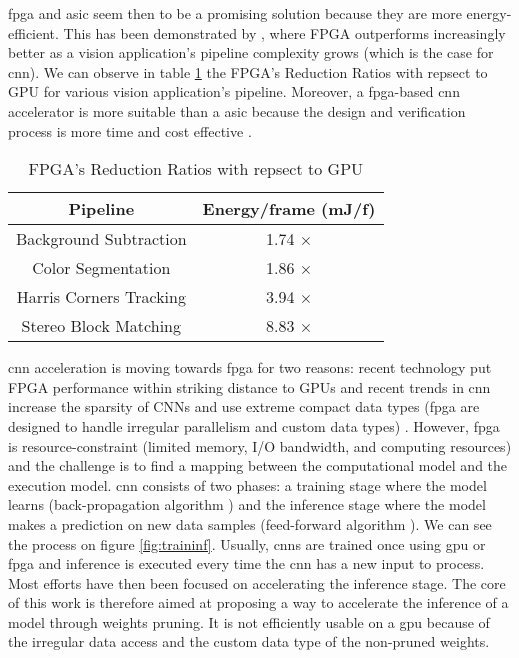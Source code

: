 \acrshort{fpga} and \acrshort{asic} seem then to be a promising solution because they are more energy-efficient. This has been demonstrated by \cite{qasaimeh_comparing_2019}, where FPGA outperforms increasingly better as a vision application’s pipeline complexity grows (which is the case for \acrshort{cnn}). We can observe in table \ref{tab:benchener} the FPGA’s Reduction Ratios with repsect to GPU for various vision application’s pipeline. Moreover, a \acrshort{fpga}-based \acrshort{cnn} accelerator is more suitable than a \acrshort{asic} because the design and verification process is more time and cost effective \cite{motamedi_placid_2017}.
\begin{table}
    \center
    \begin{tabular}{|c|c|}
        \hline
        Pipeline & Energy/frame (mJ/f) \\
        \hline
        Background Subtraction & 1.74 $\times$\\
        \hline
        Color Segmentation & 1.86 $\times$ \\
        \hline
        Harris Corners Tracking & 3.94 $\times$ \\
        \hline
        Stereo Block Matching & 8.83 $\times$ \\
        \hline
    \end{tabular}
    \caption{FPGA’s Reduction Ratios with repsect to GPU \cite{qasaimeh_comparing_2019}}
    \label{tab:benchener}
\end{table} \newline \newline
%
\acrshort{cnn} acceleration is moving towards \acrshort{fpga} for two reasons: recent technology put FPGA performance within striking distance to GPUs and recent trends in \acrshort{cnn} increase the sparsity of CNNs and use extreme compact data types (\acrshort{fpga} are designed to handle irregular parallelism and custom data types) \cite{nurvitadhi_can_2017}. However, \acrshort{fpga} is resource-constraint (limited memory, I/O bandwidth, and computing resources) and the challenge is to find a mapping between the computational model and the execution model. \newline \newline
%
\acrshort{cnn} consists of two phases: a training stage where the model learns (back-propagation algorithm \cite{lecun_backpropagation_1989}) and the inference stage where the model makes a prediction on new data samples (feed-forward algorithm \cite{zhang_optimizing_2015}). We can see the process on figure \ref{fig:traininf}. Usually, \acrshort{cnn}s are trained once using \acrshort{gpu} or \acrshort{fpga} and inference is executed every time the \acrshort{cnn} has a new input to process. Most efforts have then been focused on accelerating the inference stage. The core of this work is therefore aimed at proposing a way to accelerate the inference of a model through weights pruning. It is not efficiently usable on a \acrshort{gpu} because of the irregular data access and the custom data type of the non-pruned weights.
